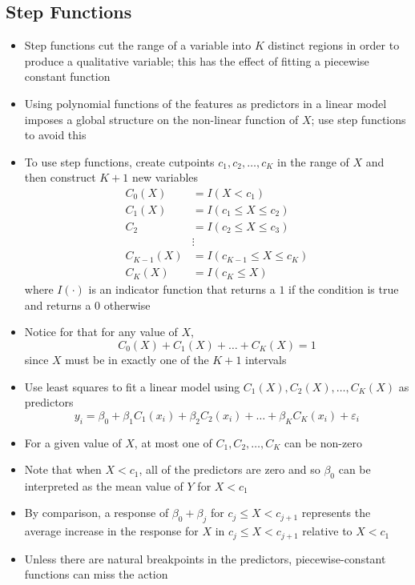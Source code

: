 \documentclass[12pt]{article}
\begin{document}
\subsection{Step Functions}
\begin{itemize} 
\item Step functions cut the range of a variable into $K$ distinct regions in order to produce a qualitative variable; this has the effect of fitting a piecewise constant function
\item Using polynomial functions of the features as predictors in a linear model imposes a global structure on the non-linear function of $X$; use step functions to avoid this 
\item To use step functions, create cutpoints $c_1,c_2,\dots,c_K$ in the range of $X$ and then construct $K+1$ new variables $$ \begin{aligned} C_0(X) &= I(X < c_1) \\ C_1(X) &= I(c_1 \leq X \leq c_2) \\ C_2 &= I(c_2 \leq X \leq c_3) \\ &\vdots \\ C_{K-1}(X) &= I(c_{K-1} \leq X \leq c_K) \\ C_K(X) &= I(c_K \leq X) \end{aligned} $$ where $I(\cdot)$ is an indicator function that returns a $1$ if the condition is true and returns a $0$ otherwise 
\item Notice for that for any value of $X$, $$C_0(X) + C_1(X) + \dots + C_K(X) = 1$$ since $X$ must be in exactly one of the $K+1$ intervals
\item Use least squares to fit a linear model using $C_1(X), C_2(X),\dots,C_K(X)$ as predictors $$ y_i = \beta_0 + \beta_1C_1(x_i) + \beta_2C_2(x_i) + \dots + \beta_KC_K(x_i) + \varepsilon_i $$ 
\item For a given value of $X$, at most one of $C_1,C_2,\dots,C_K$ can be non-zero
\item Note that when $X < c_1$, all of the predictors are zero and so $\beta_0$ can be interpreted as the mean value of $Y$ for $X < c_1$ 
\item By comparison, a response of $\beta_0 + \beta_j$ for $c_j \leq X < c_{j+1}$ represents the average increase in the response for $X$ in $c_j \leq X < c_{j+1}$ relative to $X < c_1$ 
\item Unless there are natural breakpoints in the predictors, piecewise-constant functions can miss the action
\end{itemize}
\end{document}
